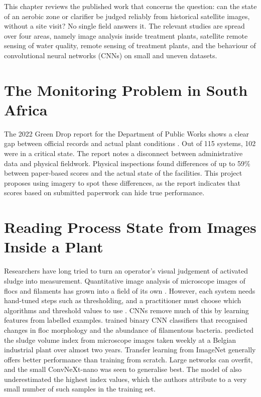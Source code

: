 \label{chap:literature}

This chapter reviews the published work that concerns the question: can the state of an aerobic zone or clarifier be judged reliably from historical satellite images, without a site visit? No single field answers it. The relevant studies are spread over four areas, namely image analysis inside treatment plants, satellite remote sensing of water quality, remote sensing of treatment plants, and the behaviour of convolutional neural networks (CNNs) on small and uneven datasets.

\section{The Monitoring Problem in South Africa}
\label{sec:sa_monitoring}

The 2022 Green Drop report for the Department of Public Works shows a clear gap between official records and actual plant conditions \citep{dws2022greendrop}. Out of 115 systems, 102 were in a critical state. The report notes a disconnect between administrative data and physical fieldwork. Physical inspections found differences of up to 59\% between paper-based scores and the actual state of the facilities. This project proposes using imagery to spot these differences, as the report indicates that scores based on submitted paperwork can hide true performance.

\section{Reading Process State from Images Inside a Plant}
\label{sec:in_plant_imaging}

Researchers have long tried to turn an operator's visual judgement of activated sludge into measurement. Quantitative image analysis of microscope images of flocs and filaments has grown into a field of its own \citep{costa2013}. However, each system needs hand-tuned steps such as thresholding, and a practitioner must choose which algorithms and threshold values to use \citep{borzooei2024}. CNNs remove much of this by learning features from labelled examples. \citet{satoh2021} trained binary CNN classifiers that recognised changes in floc morphology and the abundance of filamentous bacteria. \citet{borzooei2024} predicted the sludge volume index from microscope images taken weekly at a Belgian industrial plant over almost two years. Transfer learning from ImageNet generally offers better performance than training from scratch. Large networks can overfit, and the small ConvNeXt-nano was seen to generalise best. The model of \citet{borzooei2024} also underestimated the highest index values, which the authors attribute to a very small number of such samples in the training set.

